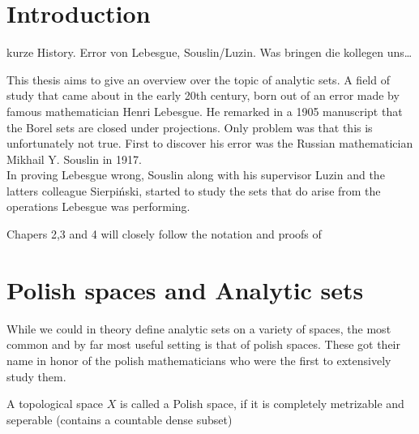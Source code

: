 \documentclass[10pt, a4paper, titlepage]{article}
\numberwithin{equation}{section}
\begin{document}
\hypersetup{pageanchor=false}


\newpage

\thispagestyle{empty}



\newpage

\tableofcontents

\newpage
\hypersetup{pageanchor=true}
\renewcommand{\thepage}{ \arabic{page} }

\setcounter{page}{1}
\onehalfspacing







\section{Introduction}
kurze History. Error von Lebesgue, Souslin/Luzin. Was bringen die kollegen uns\ldots

This thesis aims to give an overview over the topic of analytic sets. 
A field of study that came about in the early 20th century, born out of an error made by famous mathematician Henri Lebesgue. 
He remarked in a 1905 manuscript that the Borel sets are closed under projections. 
Only problem was that this is unfortunately not true. 
First to discover his error was the Russian mathematician Mikhail Y. Souslin in 1917. \cite{rogers1980}
\\
In proving Lebesgue wrong, Souslin along with his supervisor Luzin and the latters colleague Sierpiński, started to study the sets that do arise from the operations Lebesgue was performing.


Chapers 2,3 and 4 will closely follow the notation and proofs of \cite{cohn2013}


\section{Polish spaces and Analytic sets}
While we could in theory define analytic sets on a variety of spaces, the most common and by far most useful setting is that of polish spaces. These got their name in  honor of the polish mathematicians who were the first to extensively study them.

\begin{definition}
	A topological space $X$ is called a Polish space, if it is completely metrizable and seperable (contains a countable dense subset)
\end{definition}
\end{document}
